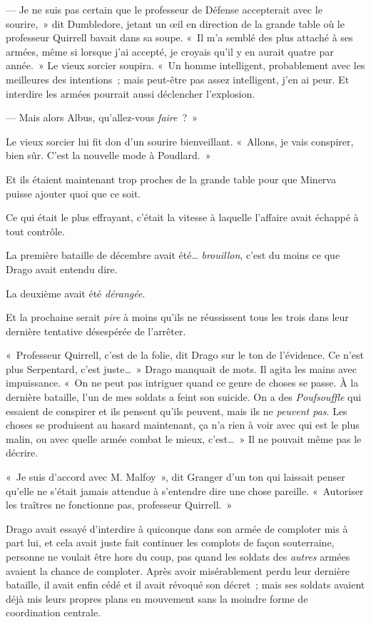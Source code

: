 --- Je ne suis pas certain que le professeur de Défense accepterait avec le sourire,~» dit Dumbledore, jetant un œil en direction de la grande table où le professeur Quirrell bavait dans sa soupe.
«~Il m'a semblé des plus attaché à ses armées, même si lorsque j'ai accepté, je croyais qu'il y en aurait quatre par année.~»
Le vieux sorcier soupira.
«~Un homme intelligent, probablement avec les meilleures des intentions~; mais peut-être pas assez intelligent, j'en ai peur.
Et interdire les armées pourrait aussi déclencher l'explosion.

--- Mais alors Albus, qu'allez-vous \emph{faire}~?~»

Le vieux sorcier lui fit don d'un sourire bienveillant.
«~Allons, je vais conspirer, bien sûr.
C'est la nouvelle mode à Poudlard.~»

Et ils étaient maintenant trop proches de la grande table pour que Minerva puisse ajouter quoi que ce soit.

\later

Ce qui était le plus effrayant, c'était la vitesse à laquelle l'affaire avait échappé à tout contrôle.

La première bataille de décembre avait été…
\emph{brouillon}, c'est du moins ce que Drago avait entendu dire.

La deuxième avait été \emph{dérangée}.

Et la prochaine serait \emph{pire} à moins qu'ils ne réussissent tous les trois dans leur dernière tentative désespérée de l'arrêter.

«~Professeur Quirrell, c'est de la folie, dit Drago sur le ton de l'évidence.
Ce n'est plus Serpentard, c'est juste…~»
Drago manquait de mots.
Il agita les mains avec impuissance.
«~On ne peut pas intriguer quand ce genre de choses se passe.
À la dernière bataille, l'un de mes soldats a feint son suicide.
On a des \emph{Poufsouffle} qui essaient de conspirer et ils pensent qu'ils peuvent, mais ils ne \emph{peuvent pas}.
Les choses se produisent au hasard maintenant, ça n'a rien à voir avec qui est le plus malin, ou avec quelle armée combat le mieux, c'est…~»
Il ne pouvait même pas le décrire.

«~Je suis d'accord avec M. Malfoy~», dit Granger d'un ton qui laissait penser qu'elle ne s'était jamais attendue à s'entendre dire une chose pareille.
«~Autoriser les traîtres ne fonctionne pas, professeur Quirrell.~»

Drago avait essayé d'interdire à quiconque dans son armée de comploter mis à part lui, et cela avait juste fait continuer les complots de façon souterraine, personne ne voulait être hors du coup, pas quand les soldats des \emph{autres} armées avaient la chance de comploter.
Après avoir misérablement perdu leur dernière bataille, il avait enfin cédé et il avait révoqué son décret~; mais ses soldats avaient déjà mis leurs propres plans en mouvement sans la moindre forme de coordination centrale.

